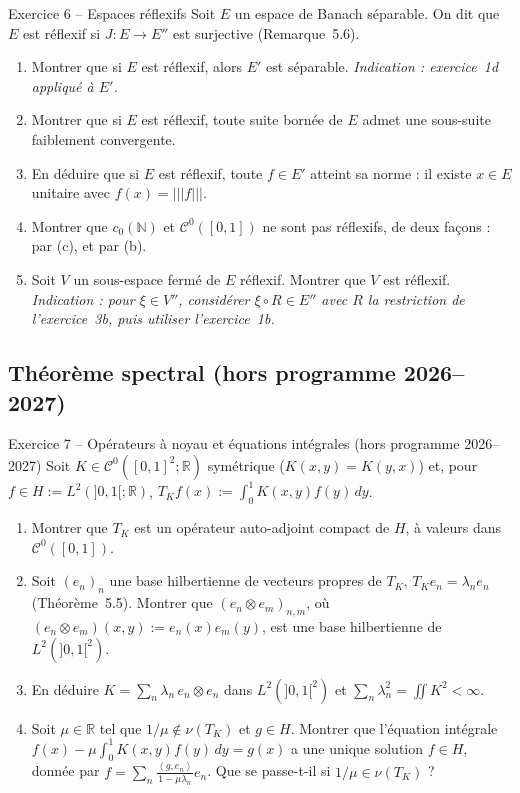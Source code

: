 \documentclass[11pt,a4paper]{article}
\newcommand{\R}{\mathbb{R}}
\newcommand{\N}{\mathbb{N}}
\newcommand{\opnorm}[1]{|\!|\!|#1|\!|\!|}
\newcommand{\ps}[2]{\left\langle #1,#2\right\rangle}
\newcommand{\Cz}{\mathcal{C}^0}
\theoremstyle{definition}
\begin{document}
\begin{exo}{Exercice 6 -- Espaces réflexifs}
Soit $E$ un espace de Banach séparable. On dit que $E$ est réflexif si $J:E\to E''$ est surjective (Remarque~5.6).
\begin{enumerate}[label=(\alph*)]
  \item Montrer que si $E$ est réflexif, alors $E'$ est séparable. \emph{Indication : exercice~1d appliqué à $E'$.}
  \item Montrer que si $E$ est réflexif, toute suite bornée de $E$ admet une sous-suite faiblement convergente.
  \item En déduire que si $E$ est réflexif, toute $f\in E'$ atteint sa norme : il existe $x\in E$ unitaire avec $f(x)=\opnorm f$.
  \item Montrer que $c_0(\N)$ et $\Cz([0,1])$ ne sont pas réflexifs, de deux façons : par (c), et par (b).
  \item Soit $V$ un sous-espace fermé de $E$ réflexif. Montrer que $V$ est réflexif. \emph{Indication : pour $\xi\in V''$, considérer $\xi\circ R\in E''$ avec $R$ la restriction de l'exercice~3b, puis utiliser l'exercice~1b.}
\end{enumerate}
\end{exo}

\subsection*{Théorème spectral (hors programme 2026--2027)}

\begin{exo}{Exercice 7 -- Opérateurs à noyau et équations intégrales (hors programme 2026--2027)}
Soit $K\in\Cz([0,1]^2;\R)$ symétrique ($K(x,y)=K(y,x)$) et, pour $f\in H:=L^2(]0,1[;\R)$, $T_Kf(x):=\int_0^1K(x,y)f(y)\,dy$.
\begin{enumerate}[label=(\alph*)]
  \item Montrer que $T_K$ est un opérateur auto-adjoint compact de $H$, à valeurs dans $\Cz([0,1])$.
  \item Soit $(e_n)_n$ une base hilbertienne de vecteurs propres de $T_K$, $T_Ke_n=\lambda_ne_n$ (Théorème~5.5). Montrer que $(e_n\otimes e_m)_{n,m}$, où $(e_n\otimes e_m)(x,y):=e_n(x)e_m(y)$, est une base hilbertienne de $L^2(]0,1[^2)$.
  \item En déduire $K=\sum_n\lambda_n\,e_n\otimes e_n$ dans $L^2(]0,1[^2)$ et $\sum_n\lambda_n^2=\iint K^2<\infty$.
  \item Soit $\mu\in\R$ tel que $1/\mu\notin\nu(T_K)$ et $g\in H$. Montrer que l'équation intégrale $f(x)-\mu\int_0^1K(x,y)f(y)\,dy=g(x)$ a une unique solution $f\in H$, donnée par $f=\sum_n\frac{\ps g{e_n}}{1-\mu\lambda_n}e_n$. Que se passe-t-il si $1/\mu\in\nu(T_K)$ ?
\end{enumerate}
\end{exo}
\end{document}
